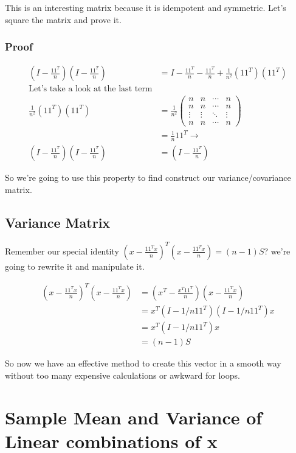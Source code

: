 This is an interesting matrix because it is idempotent and symmetric. Let's square the matrix and prove it.
\subsubsection{Proof}
\begin{align*}
    (I-\frac{11^T}{n})(I-\frac{11^T}{n}) &= I-\frac{11^T}{n}-\frac{11^T}{n}+\frac{1}{n^2}(11^T)(11^T) \\
    \text{Let's take a look at the last term}\\
    \frac{1}{n^2}(11^T)(11^T) &= \frac{1}{n^2}\begin{pmatrix}
        n & n & \cdots & n \\
        n & n & \cdots & n \\
        \vdots & \vdots & \ddots & \vdots\\
        n & n & \cdots & n
    \end{pmatrix}\\
    &= \frac{1}{n}11^T \rightarrow \\
    (I-\frac{11^T}{n})(I-\frac{11^T}{n}) &= (I-\frac{11^T}{n})
\end{align*}

So we're going to use this property to find construct our variance/covariance matrix.

\subsection{Variance Matrix}
Remember our special identity $(x-\frac{11^Tx}{n})^T(x-\frac{11^Tx}{n}) = (n-1)S$? we're going to rewrite it and manipulate it.

\begin{align*}
    (x-\frac{11^Tx}{n})^T(x-\frac{11^Tx}{n}) &= (x^T-\frac{x^T11^T}{n})(x-\frac{11^Tx}{n}) \\
    &= x^T (I-1/n11^T)(I-1/n11^T)x\\
    &= x^T (I-1/n11^T)x\\
    &= (n-1)S
\end{align*}

So now we have an effective method to create this vector in a smooth way without too many expensive calculations or awkward for loops.

\section{Sample Mean and Variance of Linear combinations of x}

